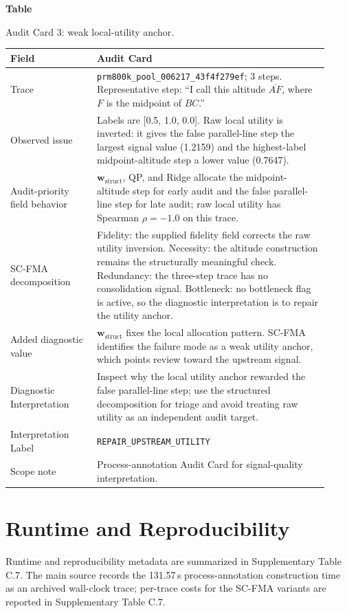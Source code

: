 \documentclass[a4paper,fleqn]{cas-sc}
\newcommand{\wstruct}{\ensuremath{\mathbf{w}_{\mathrm{struct}}}}
\begin{document}
\par\medskip
{}\label{tab:audit-card-utility}
\noindent\textbf{Table~\thetable}\par
\noindent Audit Card 3: weak local-utility anchor.
\begin{center}
\small
\renewcommand{\arraystretch}{1.08}
\begin{tabular}{p{0.25\linewidth}p{0.67\linewidth}}
\toprule
\textbf{Field} & \textbf{Audit Card} \\
\midrule
Trace & \texttt{prm800k\_pool\_006217\_43f4f279ef}; 3 steps. Representative step: ``I call this altitude $\overline{AF}$, where $F$ is the midpoint of $BC$.'' \\
Observed issue & Labels are [0.5, 1.0, 0.0]. Raw local utility is inverted: it gives the false parallel-line step the largest signal value (1.2159) and the highest-label midpoint-altitude step a lower value (0.7647). \\
Audit-priority field behavior & \wstruct{}, QP, and Ridge allocate the midpoint-altitude step for early audit and the false parallel-line step for late audit; raw local utility has Spearman $\rho=-1.0$ on this trace. \\
SC-FMA decomposition & Fidelity: the supplied fidelity field corrects the raw utility inversion. Necessity: the altitude construction remains the structurally meaningful check. Redundancy: the three-step trace has no consolidation signal. Bottleneck: no bottleneck flag is active, so the diagnostic interpretation is to repair the utility anchor. \\
Added diagnostic value & \wstruct{} fixes the local allocation pattern. SC-FMA identifies the failure mode as a weak utility anchor, which points review toward the upstream signal. \\
Diagnostic Interpretation & Inspect why the local utility anchor rewarded the false parallel-line step; use the structured decomposition for triage and avoid treating raw utility as an independent audit target. \\
Interpretation Label & \texttt{REPAIR\_UPSTREAM\_UTILITY} \\
Scope note & Process-annotation Audit Card for signal-quality interpretation. \\
\bottomrule
\end{tabular}
\end{center}
\medskip

\section{Runtime and Reproducibility}
\label{app:runtime-reproducibility}

Runtime and reproducibility metadata are summarized in Supplementary Table C.7. The main source records the 131.57\,s process-annotation construction time as an archived wall-clock trace; per-trace costs for the SC-FMA variants are reported in Supplementary Table C.7.


\clearpage


\end{document}
